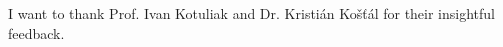 \section*{}
\vspace*{\fill}
\noindent
I want to thank Prof. Ivan Kotuliak and Dr. Kristián Košťál for their insightful feedback.
